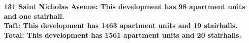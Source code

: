 \bf{131 Saint Nicholas Avenue}: This development has 98 apartment units and one stairhall.\\\bf{Taft}: This development has 1463 apartment units and 19 stairhalls.\\\bf{Total}: This development has 1561 apartment units and 20 stairhalls.\\